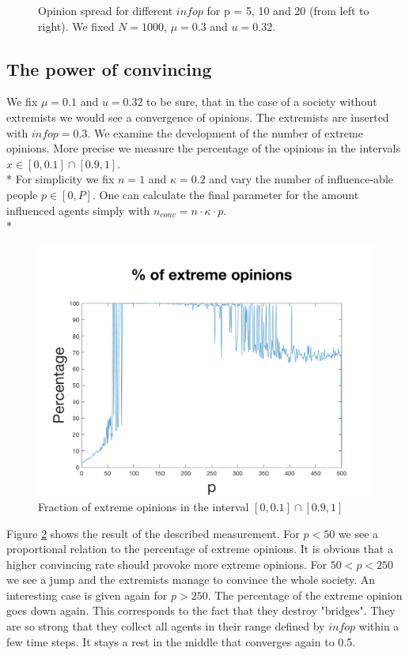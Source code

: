 \documentclass[11pt]{article}
\begin{document}
\begin{figure}[!htb]
\caption{Opinion spread for different $infop$ for p = 5, 10 and 20 (from left to right). We fixed $N = 1000$, $\mu = 0.3$ and $u = 0.32$.}
\label{fig:varinfop}
\end{figure}



\subsection{The power of convincing}
We fix $\mu = 0.1$ and $u = 0.32$ to be sure, that in the case of a society without extremists we would see a convergence of opinions. The extremists are inserted with $infop = 0.3$. We examine the development of the number of extreme opinions. More precise we measure the percentage of the opinions in the intervals $x \in [0, 0.1] \cap [0.9, 1]$. \\*
For simplicity we fix $n = 1$ and $\kappa = 0.2$ and vary the number of influence-able people $p \in [0,P]$. One can calculate the final parameter for the amount influenced agents simply with $n_{conv} = n\cdot\kappa\cdot p$. \\*

\begin{figure}[!htb]
\center

  \includegraphics[width=0.6\linewidth]{gen_plot_intervall_201712182172720605e+01.png}
  \caption{Fraction of extreme opinions in the interval $[0, 0.1] \cap [0.9, 1]$}
  \label{fig:varynconv}
\end{figure}

Figure \ref{fig:varynconv} shows the result of the described measurement. For $p < 50$ we see a proportional relation to the  percentage of extreme opinions. It is obvious that a higher convincing rate should provoke more extreme opinions. For $50 < p < 250$ we see a jump and the extremists manage to convince the whole society. An interesting case is given again for $p > 250$. The percentage of the extreme opinion goes down again. This corresponds to the fact that they destroy "bridges". They are so strong that they collect all agents in their range defined by $infop$ within a few time steps. It stays a rest in the middle that converges again to 0.5.
\end{document}
